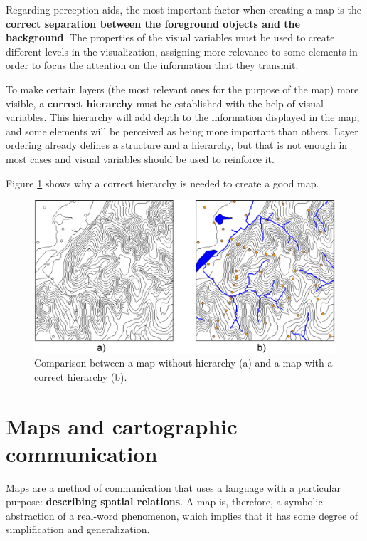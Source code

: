 Regarding perception aids, the most important factor when creating a map is the \textbf{correct separation between the foreground objects and the back\-ground}. The properties of the visual variables must be used to create different levels in the visualization, assigning more relevance to some elements in order to focus the attention on the information that they transmit.

To make certain layers (the most relevant ones for the purpose of the map) more visible, a \textbf{correct hierarchy} must be established with the help of visual variables. This hierarchy will add depth to the information displayed in the map, and some elements will be perceived as being more important than others. Layer ordering already defines a structure and a hierarchy, but that is not enough in most cases and visual variables should be used to reinforce it.

Figure \ref{Fig:HierarchyMap} shows why a correct hierarchy is needed to create a good map.

\begin{figure}[!hbt]
\centering
\includegraphics[width=\columnwidth]{Visualization/HierarchyMap.png}
\caption{\small Comparison between a map without hierarchy (a) and a map with a correct hierarchy (b).}
\label{Fig:HierarchyMap} 
\end{figure}


\section{Maps and cartographic communication}

Maps are a method of communication that uses a language with a particular purpose: \textbf{describing spatial relations}. A map is, therefore, a symbolic abstraction of a real-word phenomenon, which implies that it has some degree of simplification and generalization.

